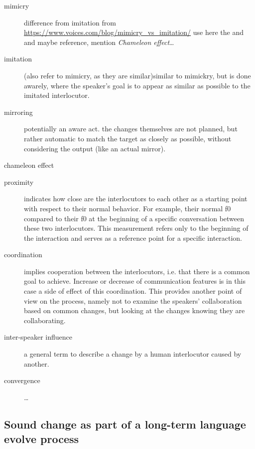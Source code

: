 \begin{description}
	\item[mimicry] difference from imitation from \url{https://www.voices.com/blog/mimicry_vs_imitation/} use here the \citet{Chartrand1999chameleon} and \citet{Gueguen2009mimicry} and maybe \citet{Parrill2006seeing} reference, mention \textit{Chameleon effect}\ldots
	
	\item[imitation] (also refer to mimicry, as they are similar)similar to mimickry, but is done awarely, where the speaker's goal is to appear as similar as possible to the imitated interlocutor.
	
	\item[mirroring] potentially an aware act. the changes themselves are not planned, but rather automatic to match the target as closely as possible, without considering the output (like an actual mirror).
	
	\item[chameleon effect] \citep{Chartrand1999chameleon}
	
	\item[proximity] indicates how close are the interlocutors to each other as a starting point with respect to their normal behavior.
	For example, their normal f0 compared to their f0 at the beginning of a specific conversation between these two interlocutors.
	This measurement refers only to the beginning of the interaction and serves as a reference point for a specific interaction.
	
	\item[coordination] implies cooperation between the interlocutors, i.e. that there is a common goal to achieve.
	Increase or decrease of communication features is in this case a side of effect of this coordination.
	This provides another point of view on the process, namely not to examine the speakers' collaboration based on common changes, but looking at the changes knowing they are collaborating.
	
	\item[inter-speaker influence] a general term to describe a change by a human interlocutor caused by another.
	
	\item[convergence] \ldots
\end{description}

\subsection[Long-term sound change]{Sound change as part of a long-term language evolve process}
\label{subsec:sound_change}

